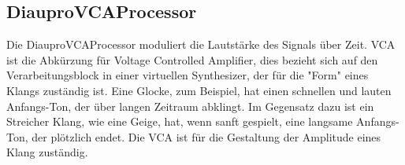 \subsection{DiauproVCAProcessor}

Die DiauproVCAProcessor moduliert die Lautstärke des Signals über Zeit. VCA ist die Abkürzung für Voltage Controlled Amplifier, dies bezieht sich auf den Verarbeitungsblock in einer virtuellen Synthesizer, der für die "Form" eines Klangs zuständig ist. Eine Glocke, zum Beispiel, hat einen schnellen und lauten Anfangs-Ton, der über langen Zeitraum abklingt. Im Gegensatz dazu ist ein Streicher Klang, wie eine Geige, hat, wenn sanft gespielt, eine langsame Anfangs-Ton, der plötzlich endet. Die VCA ist für die Gestaltung der Amplitude eines Klang zuständig.